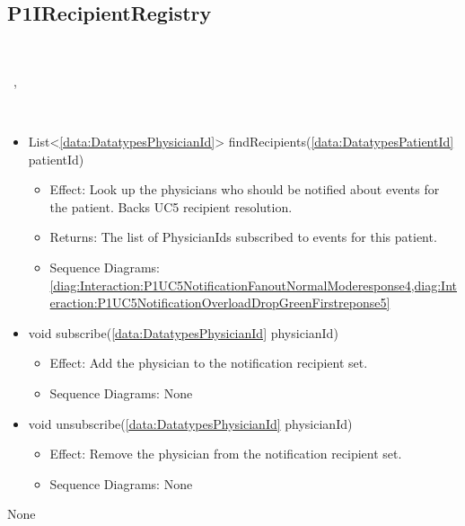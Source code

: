   \subsection{P1IRecipientRegistry}\label{int:InterfacesP1IRecipientRegistry}
    \begin{description}
      \item[Provided by:] \iconcomponent{}~
      \item[Required by:] \iconcomponent{}~, \iconcomponent{}~ 
      \item[Operations:] ~
    \begin{itemize}[noitemsep,nolistsep,leftmargin=-.25cm]
      \item \textsf{List\textless{}\ref{data:DatatypesPhysicianId}\textgreater{} findRecipients(\ref{data:DatatypesPatientId} patientId)}
        \begin{itemize}[noitemsep,nolistsep]
           \item Effect: Look up the physicians who should be notified about events for the patient. Backs UC5 recipient resolution. 
           \item Returns: The list of PhysicianIds subscribed to events for this patient.
           \item Sequence Diagrams: \cref{diag:Interaction:P1UC5NotificationFanoutNormalModeresponse4,diag:Interaction:P1UC5NotificationOverloadDropGreenFirstreponse5}
        \end{itemize}
      \item \textsf{void subscribe(\ref{data:DatatypesPhysicianId} physicianId)}
        \begin{itemize}[noitemsep,nolistsep]
           \item Effect: Add the physician to the notification recipient set. 
           \item Sequence Diagrams: None
        \end{itemize}
      \item \textsf{void unsubscribe(\ref{data:DatatypesPhysicianId} physicianId)}
        \begin{itemize}[noitemsep,nolistsep]
           \item Effect: Remove the physician from the notification recipient set. 
           \item Sequence Diagrams: None
        \end{itemize}
    \end{itemize}
      \item[Diagrams:] None
    \end{description}

